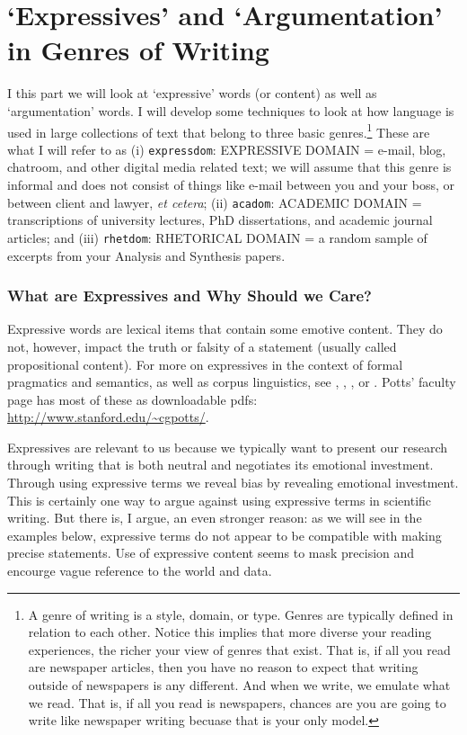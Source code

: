 \documentclass{article}
\begin{document}
\part{`Expressives' and `Argumentation' in Genres of Writing}\label{genre}
I this part we will look at `expressive' words (or content) as well as `argumentation' words. I will develop some techniques to look at how language is used in large collections of text that belong to three basic genres.\footnote{A genre of writing is a style, domain, or type. Genres are typically defined in relation to each other. Notice this implies that more diverse your reading experiences, the richer your view of genres that exist. That is, if all you read are newspaper articles, then you have no reason to expect that writing outside of newspapers is any different. And when we write, we emulate what we read. That is, if all you read is newspapers, chances are you are going to write like newspaper writing becuase that is your only model.} These are what I will refer to as (i) \texttt{expressdom}: EXPRESSIVE DOMAIN = e-mail, blog, chatroom, and other digital media related text; we will assume that this genre is informal and does not consist of things like e-mail between you and your boss, or between client and lawyer, {\sl et cetera}; (ii) \texttt{acadom}: ACADEMIC DOMAIN = transcriptions of university lectures, PhD dissertations, and academic journal articles; and (iii) \texttt{rhetdom}: RHETORICAL DOMAIN = a random sample of excerpts from your Analysis and Synthesis papers.   

\section{What are Expressives and Why Should we Care?}
Expressive words are lexical items that contain some emotive content. They do not, however, impact the truth or falsity of a statement (usually called propositional content). For more on expressives in the context of formal pragmatics and semantics, as well as corpus linguistics, see \cite{Constant:etal08}, \cite{Potts06TARGET}, \cite{Potts03NELS}, or \cite{Potts08HSK}. Potts' faculty page has most of these as downloadable pdfs: \url{http://www.stanford.edu/~cgpotts/}.  

Expressives are relevant to us because we typically want to present our research through writing that is both neutral and negotiates its emotional investment. Through using expressive terms we reveal bias by revealing emotional investment. This is certainly one way to argue against using expressive terms in scientific writing. But there is, I argue, an even stronger reason: as we will see in the examples below, expressive terms do not appear to be compatible with making precise statements. Use of expressive content seems to mask precision and encourge vague reference to the world and data.   
\end{document}
